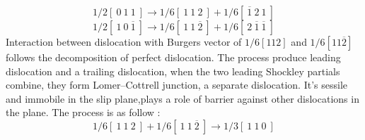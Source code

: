 \documentclass[metals,article,submit,moreauthors,pdftex,10pt,a4paper]{Definitions/mdpi}
\begin{document}

\begin{equation}\label{eq:dis-1}
1/2 [\ 0\ 1\ 1\ ] \to 1/6[\ 1\ 1\ 2\ ]+1/6[\ \overline{1}\ 2\ 1\ ]
\end{equation}
\begin{equation}\label{eq:dis-2}
1/2 [\ 1\ 0\ \overline{1}\ ] \to 1/6 [\ 1\ 1\ \overline{2}\ ] + 1/6[\ 2\ \overline{1}\ \overline{1}\ ]
\end{equation}
Interaction between dislocation with Burgers vector of $1/6 [112] $ and $ 1/6 [11\overline{2}]$ follows the decomposition of perfect dislocation. The process produce leading dislocation and a trailing dislocation, when the two leading Shockley partials combine, they form Lomer–Cottrell junction, a separate dislocation. It's sessile and immobile in the slip plane,plays a role of barrier against other dislocations in the plane. The process is as follow :
\begin{equation}\label{eq:dis-3}
1/6 [\ 1\ 1\ 2\ ] + 1/6 [\ 1\ 1\  \overline{2}\ ] \to 1/3 [\ 1\ 1\ 0\ ]
\end{equation}
\end{document}
